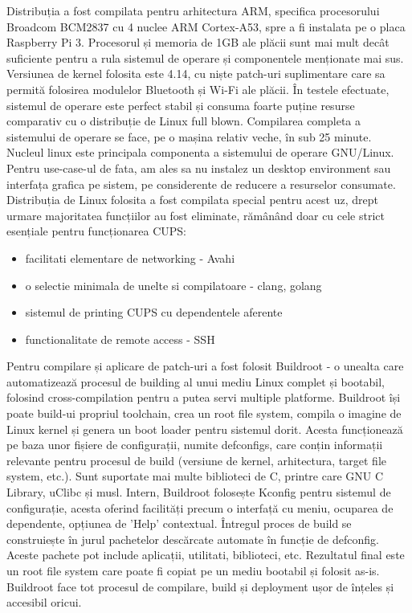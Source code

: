 \documentclass[a4paper, 12pt, twoside]{report}
\begin{document}
Distribuția a fost compilata pentru arhitectura ARM, specifica procesorului Broadcom BCM2837 cu 4 nuclee ARM Cortex-A53, spre a fi instalata pe o placa Raspberry Pi 3. Procesorul și memoria de 1GB ale plăcii sunt mai mult decât suficiente pentru a rula sistemul de operare și componentele menționate mai sus. Versiunea de kernel folosita este 4.14, cu niște patch-uri suplimentare care sa permită folosirea modulelor Bluetooth și Wi-Fi ale plăcii. În testele efectuate, sistemul de operare este perfect stabil și consuma foarte puține resurse comparativ cu o distribuție de Linux full blown. Compilarea completa a sistemului de operare se face, pe o mașina relativ veche, în sub 25 minute. Nucleul linux este principala componenta a sistemului de operare GNU/Linux. Pentru use-case-ul de fata, am ales sa nu instalez un desktop environment sau interfața grafica pe sistem, pe considerente de reducere a resurselor consumate.
Distribuția de Linux folosita a fost compilata special pentru acest uz, drept urmare majoritatea funcțiilor au fost eliminate, rămânând doar cu cele strict esențiale pentru funcționarea CUPS:
\begin{itemize}
\item facilitati elementare de networking - Avahi
\item o selectie minimala de unelte si compilatoare - clang, golang
\item sistemul de printing CUPS cu dependentele aferente
\item functionalitate de remote access - SSH
\end{itemize}

Pentru compilare și aplicare de patch-uri a fost folosit Buildroot - o unealta care automatizează procesul de building al unui mediu Linux complet și bootabil, folosind cross-compilation pentru a putea servi multiple platforme. Buildroot își poate build-ui propriul toolchain, crea un root file system, compila o imagine de Linux kernel și genera un boot loader pentru sistemul dorit. Acesta funcționează pe baza unor fișiere de configurații, numite defconfigs, care conțin informații relevante pentru procesul de build (versiune de kernel, arhitectura, target file system, etc.). Sunt suportate mai multe biblioteci de C, printre care GNU C Library, uClibc și musl. Intern, Buildroot folosește Kconfig pentru sistemul de configurație, acesta oferind facilități precum o interfață cu meniu, ocuparea de dependente, opțiunea de 'Help' contextual. Întregul proces de build se construiește în jurul pachetelor descărcate automate în funcție de defconfig. Aceste pachete pot include aplicații, utilitati, biblioteci, etc. Rezultatul final este un root file system care poate fi copiat pe un mediu bootabil și folosit as-is. Buildroot face tot procesul de compilare, build și deployment ușor de înțeles și accesibil oricui.
\end{document}
